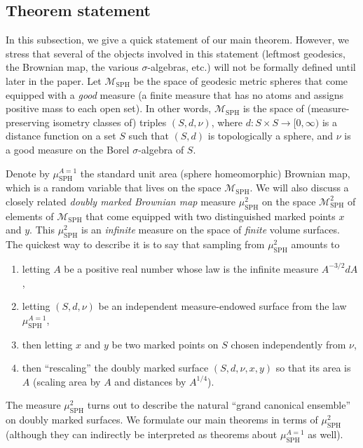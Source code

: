 \documentclass[10pt]{amsart}
\let\mathcal\mathscr
\theoremstyle{plain}
\numberwithin{theorem}{section}
\theoremstyle{definition}
\newcommand\gmsspace{{\mathcal M}_{\mathrm{SPH}}}
\newcommand{\mustwo}{\mu_{\mathrm{SPH}}^2}
\newcommand{\musa}{{\mu_{\mathrm{SPH}}^{A=1}}}
\begin{document}
\pagebreak[2]
\subsection{Theorem statement}
\label{subsec::theoremstatement}

In this subsection, we give a quick statement of our main theorem. However, we stress that several of the objects involved in this statement (leftmost geodesics, the Brownian map, the various $\sigma$-algebras, etc.) will not be formally defined until later in the paper. Let $\gmsspace$ be the space of geodesic metric spheres that come equipped with a \emph{good} measure (\ie a finite measure that has no atoms and assigns positive mass to each open set). In other words, $\gmsspace$ is the space of (measure-preserving isometry classes of) triples $(S, d, \nu)$, where $d \colon S\times S \to [0,\infty)$ is a distance function on a set $S$ such that $(S,d)$ is topologically a sphere, and $\nu$ is a good measure on the Borel $\sigma$-algebra of $S$.

Denote by $\musa$ the standard unit area (sphere homeomorphic) Brownian map, which is a random variable that lives on the space $\gmsspace$. We will also discuss a closely related \emph{doubly marked Brownian map} measure $\mustwo$ on the space $\gmsspace^2$ of elements of $\gmsspace$ that come equipped with two distinguished marked points $x$ and $y$. This $\mustwo$ is an \emph{infinite} measure on the space of \emph{finite} volume surfaces. The quickest way to describe it is to say that sampling from $\mustwo$ amounts to\begin{enumerate}
\item letting $A$ be a positive real number whose law is the infinite measure $A^{-3/2}dA$,
\item letting $(S, d, \nu)$ be an independent measure-endowed surface from the law $\musa$,
\item then letting $x$ and $y$ be two marked points on $S$ chosen independently from $\nu$,
\item then ``rescaling'' the doubly marked surface $(S, d, \nu, x, y)$ so that its area is $A$ (scaling area by $A$ and distances by $A^{1/4}$).
\end{enumerate} The measure $\mustwo$ turns out to describe the natural ``grand canonical ensemble'' on doubly marked surfaces. We formulate our main theorems in terms of $\mustwo$ (although they can indirectly be interpreted as theorems about $\musa$ as well).
\end{document}

